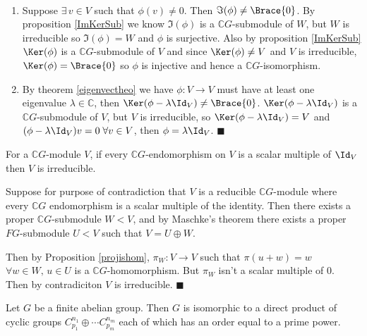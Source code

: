 \documentclass[../Project.tex]{subfiles}
\begin{document}
\begin{proo*}[\cite{2}]~ %
\vspace{-\topsep}
\begin{enumerate}
	\item Suppose $\exists \,v \in V$ such that $\phi(v) \neq 0$. Then $\Im(\phi) \neq \Brace{0}$. By proposition \ref{ImKerSub} we know $\Im(\phi)$ is a $\mathbb{C}G$-submodule of $W$, but $W$ is irreducible so $\Im(\phi) = W$ and $\phi$ is surjective. Also by proposition \ref{ImKerSub} $\Ker(\phi)$ is a $\mathbb{C}G$-submodule of $V$ and since $\Ker(\phi) \neq V$ and $V$ is irreducible, $\Ker(\phi) = \Brace{0}$ so $\phi$ is injective and hence a $\mathbb{C}G$-isomorphism.
	\item By theorem \ref{eigenvectheo} we have $\phi : V \to V$ must have at least one eigenvalue $\lambda \in \mathbb{C}$, then $\Ker(\phi - \lambda\Id_V) \neq \Brace{0}$. $\Ker(\phi - \lambda\Id_V)$ is a $\mathbb{C}G$-submodule of $V$, but $V$ is irreducible, so $\Ker(\phi - \lambda\Id_V) = V$ and $(\phi - \lambda\Id_V)v = 0\;\forall v \in V$, then $\phi = \lambda\Id_V$. $\blacksquare$
\end{enumerate}
\end{proo*}

\begin{prop}[\cite{2}]
	For a $\mathbb{C}G$-module $V$, if every $\mathbb{C}G$-endomorphism on $V$ is a scalar multiple of $\Id_V$ then $V$ is irreducible.
\end{prop}

\begin{proo*}[\cite{2}]
	Suppose for purpose of contradiction that $V$ is a reducible $\mathbb{C}G$-module where every $\mathbb{C}G$ endomorphism is a scalar multiple of the identity. Then there exists a proper $\mathbb{C}G$-submodule $W < V$, and by Maschke's theorem there exists a proper $FG$-submodule $U < V$ such that $V = U \oplus W$.

	Then by Proposition \ref{projishom}, $\pi_W : V \to V$ such that $\pi(u + w) = w$ $\forall w \in W,\,u \in U$ is a $\mathbb{C}G$-homomorphism. But $\pi_W$ isn't a scalar multiple of $0$.\\

	Then by contradiciton $V$ is irreducible. $\blacksquare$
\end{proo*}

\begin{theo}
	Let $G$ be a finite abelian group. Then $G$ is isomorphic to a direct product of cyclic groups $C_{p_1}^{n_1} \oplus \cdots C_{p_m}^{n_m}$ each of which has an order equal to a prime power.
\end{theo}
\end{document}
